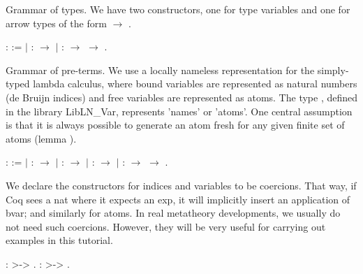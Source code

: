 \documentclass[12pt]{report}
\begin{document}
 Grammar of types. We have two constructors, one for type variables
    and one for arrow types of the form  \ensuremath{\rightarrow} .
\begin{coqdoccode}
\coqdocemptyline
\coqdocnoindent
{}  :  :=\coqdoceol
\coqdocindent{1.00em}
\ensuremath{|}    :  \ensuremath{\rightarrow} \coqdoceol
\coqdocindent{1.00em}
\ensuremath{|}  :  \ensuremath{\rightarrow}  \ensuremath{\rightarrow} .\coqdoceol
\coqdocemptyline
\end{coqdoccode}
Grammar of pre-terms. We use a locally nameless representation for the
    simply-typed lambda calculus, where bound variables are represented as 
    natural numbers (de Bruijn indices) and free variables are represented as
    atoms. The type , defined in the library LibLN\_Var, represents
    'names' or 'atoms'. One central assumption is that it is always possible
    to generate an atom fresh for any given finite set of atoms (lemma 
    ). 
\begin{coqdoccode}
\coqdocemptyline
\coqdocnoindent
{}  :  :=\coqdoceol
\coqdocindent{1.00em}
\ensuremath{|}  :  \ensuremath{\rightarrow} \coqdoceol
\coqdocindent{1.00em}
\ensuremath{|}  :  \ensuremath{\rightarrow} \coqdoceol
\coqdocindent{1.00em}
\ensuremath{|}   :  \ensuremath{\rightarrow} \coqdoceol
\coqdocindent{1.00em}
\ensuremath{|}   :  \ensuremath{\rightarrow}  \ensuremath{\rightarrow} .\coqdoceol
\coqdocemptyline
\end{coqdoccode}
We declare the constructors for indices and variables to be coercions. 
    That way, if Coq sees a nat where it expects an exp, it will implicitly 
    insert an application of bvar; and similarly for atoms. In real metatheory
    developments, we usually do not need such coercions. However, they will
    be very useful for carrying out examples in this tutorial. 
\begin{coqdoccode}
\coqdocemptyline
\coqdocnoindent
{}  :  >-> .\coqdoceol
\coqdocnoindent
{}  :  >-> .\coqdoceol
\coqdocemptyline
\end{coqdoccode}
\end{document}
